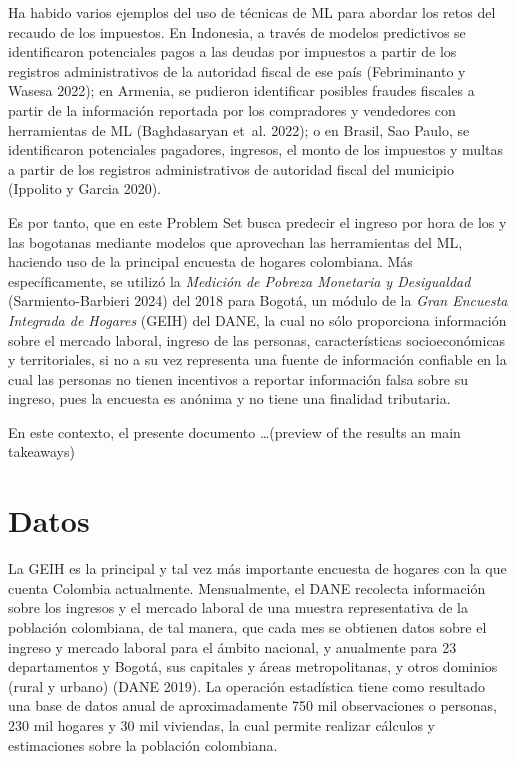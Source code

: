 \documentclass[
  11pt,
  letterpaper,
]{article}
\begin{document}
Ha habido varios ejemplos del uso de técnicas de ML para abordar los
retos del recaudo de los impuestos. En Indonesia, a través de modelos
predictivos se identificaron potenciales pagos a las deudas por
impuestos a partir de los registros administrativos de la autoridad
fiscal de ese país (Febriminanto y Wasesa 2022); en Armenia, se pudieron
identificar posibles fraudes fiscales a partir de la información
reportada por los compradores y vendedores con herramientas de ML
(Baghdasaryan et~al. 2022); o en Brasil, Sao Paulo, se identificaron
potenciales pagadores, ingresos, el monto de los impuestos y multas a
partir de los registros administrativos de autoridad fiscal del
municipio (Ippolito y Garcia 2020).

Es por tanto, que en este Problem Set busca predecir el ingreso por hora
de los y las bogotanas mediante modelos que aprovechan las herramientas
del ML, haciendo uso de la principal encuesta de hogares colombiana. Más
específicamente, se utilizó la \emph{Medición de Pobreza Monetaria y
Desigualdad} (Sarmiento-Barbieri 2024) del 2018 para Bogotá, un módulo
de la \emph{Gran Encuesta Integrada de Hogares} (GEIH) del DANE, la cual
no sólo proporciona información sobre el mercado laboral, ingreso de las
personas, características socioeconómicas y territoriales, si no a su
vez representa una fuente de información confiable en la cual las
personas no tienen incentivos a reportar información falsa sobre su
ingreso, pues la encuesta es anónima y no tiene una finalidad
tributaria.

En este contexto, el presente documento \ldots(preview of the results an
main takeaways)

\hypertarget{datos}{%
\section{Datos}\label{datos}}

La GEIH es la principal y tal vez más importante encuesta de hogares con
la que cuenta Colombia actualmente. Mensualmente, el DANE recolecta
información sobre los ingresos y el mercado laboral de una muestra
representativa de la población colombiana, de tal manera, que cada mes
se obtienen datos sobre el ingreso y mercado laboral para el ámbito
nacional, y anualmente para 23 departamentos y Bogotá, sus capitales y
áreas metropolitanas, y otros dominios (rural y urbano) (DANE 2019). La
operación estadística tiene como resultado una base de datos anual de
aproximadamente 750 mil observaciones o personas, 230 mil hogares y 30
mil viviendas, la cual permite realizar cálculos y estimaciones sobre la
población colombiana.
\end{document}
